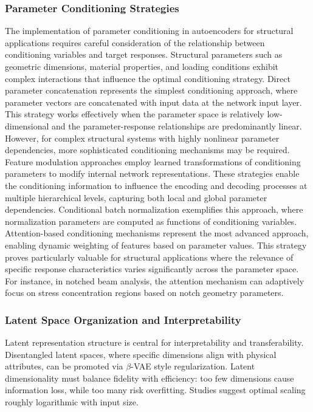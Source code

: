 \documentclass[12pt,a4paper]{report}
\begin{document}
\subsubsection*{Parameter Conditioning Strategies}

The implementation of parameter conditioning in autoencoders for structural applications requires careful consideration of the relationship between conditioning variables and target responses. Structural parameters such as geometric dimensions, material properties, and loading conditions exhibit complex interactions that influence the optimal conditioning strategy. Direct parameter concatenation represents the simplest conditioning approach, where parameter vectors are concatenated with input data at the network input layer. This strategy works effectively when the parameter space is relatively low-dimensional and the parameter-response relationships are predominantly linear. However, for complex structural systems with highly nonlinear parameter dependencies, more sophisticated conditioning mechanisms may be required. Feature modulation approaches employ learned transformations of conditioning parameters to modify internal network representations. These strategies enable the conditioning information to influence the encoding and decoding processes at multiple hierarchical levels, capturing both local and global parameter dependencies. Conditional batch normalization exemplifies this approach, where normalization parameters are computed as functions of conditioning variables. Attention-based conditioning mechanisms represent the most advanced approach, enabling dynamic weighting of features based on parameter values. This strategy proves particularly valuable for structural applications where the relevance of specific response characteristics varies significantly across the parameter space. For instance, in notched beam analysis, the attention mechanism can adaptively focus on stress concentration regions based on notch geometry parameters.

\subsubsection*{Latent Space Organization and Interpretability}

Latent representation structure is central for interpretability and transferability. Disentangled latent spaces, where specific dimensions align with physical attributes, can be promoted via $\beta$-VAE style regularization. Latent dimensionality must balance fidelity with efficiency: too few dimensions cause information loss, while too many risk overfitting. Studies suggest optimal scaling roughly logarithmic with input size.
\end{document}
